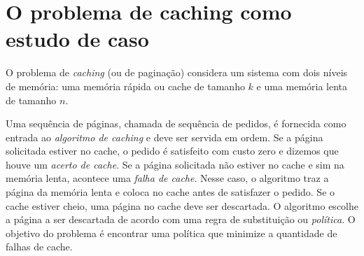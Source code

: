 


\section{O problema de caching como estudo de caso}

O problema de \emph{caching} (ou de paginação) considera um sistema com dois níveis de memória: uma memória rápida ou cache de tamanho \(k\) e uma memória lenta de tamanho \(n\). 

Uma sequência de páginas, chamada de sequência de pedidos, é fornecida como entrada ao \emph{algoritmo de caching} e deve ser servida em ordem. Se a página solicitada estiver no cache, o pedido é satisfeito com custo zero e dizemos que houve um \emph{acerto de cache}. Se a página solicitada não estiver no cache e sim na memória lenta, acontece uma \emph{falha de cache}. Nesse caso, o algoritmo traz a página da memória lenta e coloca no cache antes de satisfazer o pedido. Se o cache estiver cheio, uma página no cache deve ser descartada. O algoritmo escolhe a página a ser descartada de acordo com uma regra de substituição ou \emph{política}. O objetivo do problema é encontrar uma política que minimize a quantidade de falhas de cache. 


